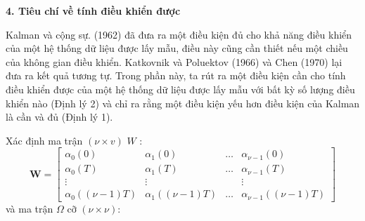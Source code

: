 \documentclass[12pt,a4paper]{article}
\begin{document}
\textbf{4. Tiêu chí về tính điều khiển được}

Kalman và cộng sự. (1962) đã đưa ra một điều kiện đủ cho khả năng điều khiển của một hệ thống dữ liệu được lấy mẫu, điều này cũng cần thiết nếu một chiều của không gian điều khiển. Katkovnik và Poluektov (1966) và Chen (1970) lại đưa ra kết quả tương tự. Trong phần này, ta rút ra một điều kiện cần  cho tính điều khiển được của một hệ thống dữ liệu được lấy mẫu với bất kỳ số lượng điều khiển nào (Định lý 2) và chỉ ra rằng một điều kiện yếu hơn điều kiện của Kalman là cần và đủ (Định lý 1).

Xác định ma trận $(\nu \times v)$ $W$ :
\begin{equation}\tag{9}\label{pt9}
	\mathbf{W}=\left[\begin{array}{cccc}
		\alpha_0(0) & \alpha_1(0) & \ldots & \alpha_{\nu-1}(0) \\
		\alpha_0(T) & \alpha_1(T) & \ldots & \alpha_{\nu-1}(T) \\
		\vdots & \vdots & & \vdots \\
		\alpha_0((\nu-1) T) & \alpha_1((\nu-1) T) & \ldots & \alpha_{\nu-1}((\nu-1) T)
	\end{array}\right]
\end{equation}
và ma trận $\Omega$ cỡ $(\nu \times \nu)$:
\end{document}

